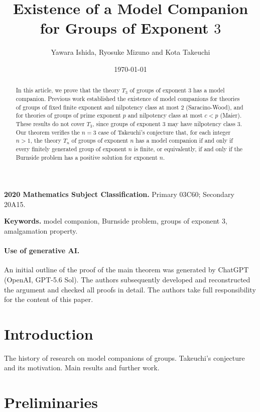 \documentclass[11pt,reqno]{article}
\title{Existence of a Model Companion for Groups of Exponent $3$}
\author{Yawara Ishida, Ryosuke Mizuno and Kota Takeuchi}
\date{\today}
\theoremstyle{definition}
\theoremstyle{remark}
\begin{document}
\maketitle

\begin{abstract}
In this article, we prove that the theory $T_3$ of groups of exponent $3$ has a model
companion. Previous work established the existence of model companions
for theories of groups of fixed finite exponent and nilpotency class
at most $2$ (Saracino-Wood), and for theories of groups of prime exponent $p$ and
nilpotency class at most $c<p$ (Maier). These results do not cover $T_3$,
since groups of exponent $3$ may have nilpotency class $3$.
Our theorem verifies the $n=3$ case of Takeuchi's conjecture that,
for each integer $n>1$, the theory $T_n$ of groups of exponent $n$
has a model companion if and only if every finitely generated group
of exponent $n$ is finite, or equivalently, if and only if the
Burnside problem has a positive solution for exponent $n$.
\end{abstract}

\medskip
\noindent\textbf{2020 Mathematics Subject Classification.}
Primary 03C60; Secondary 20A15.

\smallskip
\noindent\textbf{Keywords.}
model companion, Burnside problem, groups of exponent $3$, amalgamation property.

\paragraph{Use of generative AI.}
An initial outline of the proof of the main theorem was generated by ChatGPT (OpenAI, GPT-5.6 Sol).
The authors subsequently developed and reconstructed the argument
and checked all proofs in detail.
The authors take full responsibility for the content of this paper.


\section{Introduction}
\label{sec:introduction}

The history of research on model companions of groups.
Takeuchi's conjecture and its motivation.
Main results and further work.


\section{Preliminaries}
\label{sec:preliminaries}
\end{document}
